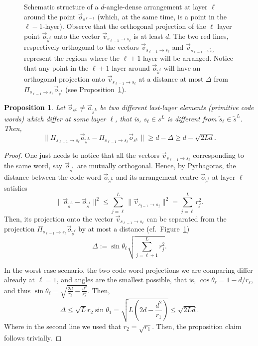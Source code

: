 \documentclass[10pt,a4paper]{amsart}
\newtheorem{proposition}{Proposition}
\begin{document}
\begin{figure}
    \centering
    
    \caption{Schematic structure of a $d$-angle-dense arrangement at layer $\ell$ around the point $\vec o_{s^{\ell-1}}$ (which, at the same time, is a point in the $\ell-1$-layer). Observe that the orthogonal projection of the $\ell$ layer point $\vec o_{\tilde s^\ell}$ onto the vector $\vec v_{s_{\ell-1}\to s_\ell}$ is at least $d$. The two red lines, respectively orthogonal to the vectors $\vec v_{s_{\ell-1}\to s_\ell}$ and $\vec v_{s_{\ell-1}\to \tilde s_\ell}$ represent the regions where the $\ell+1$ layer will be arranged. Notice that any point in the $\ell+1$ layer around $\vec o_{\tilde s^\ell}$ will have an orthogonal projection onto $\vec v_{s_{\ell-1}\to s_\ell}$ at a distance at most $\Delta$ from $\Pi_{s_{\ell-1}\to s_\ell}\vec o_{\tilde s^\ell}$ (see Proposition~\ref{proposition:concentration}).}
    \label{fig:subspaces}
\end{figure}

\begin{proposition}\label{proposition:concentration}
Let $\vec o_{s^L}\neq\vec o_{\tilde s^L}$ be two different last-layer elements (primitive code words) which differ at some layer $\ell$, that is, $s_\ell\in s^L$ is different from $\tilde s_\ell\in \tilde s^L$. Then,
\[
\|\Pi_{s_{\ell-1}\to s_\ell}\vec o_{\tilde s^L}-\Pi_{s_{\ell-1}\to s_\ell}\vec o_{s^L}\|\geq d-\Delta\geq d-\sqrt{2Ld}.
\]    
\end{proposition}

\begin{proof}
One just needs to notice that all the vectors $\vec v_{s_{\ell-1}\to s_\ell}$ corresponding to the same word, say $\vec o_{\tilde s^L}$ are mutually orthogonal. Hence, by Pythagoras, the distance between the code word $\vec o_{\tilde s^L}$ and its arrangement centre $\vec o_{\tilde s^\ell}$ at layer $\ell$ satisfies
\begin{equation}
\|\vec o_{\tilde s^L}-\vec o_{\tilde s^\ell}\|^2
\leq\sum_{j=\ell}^L \|\vec v_{s_{j-1}\to s_j}\|^2
=\sum_{j=\ell}^L r_j^2.
\end{equation}
Then, its projection onto the vector $\vec v_{s_{\ell-1}\to s_\ell}$ can be separated from the projection $\Pi_{s_{\ell-1}\to s_\ell}\vec o_{\tilde s^\ell}$ by at most a distance (cf.~Figure~\ref{fig:subspaces})
\begin{equation}\label{eq:delta_def}
    \Delta:=\sin\theta_\ell\sqrt{\sum_{j=\ell+1}^L r_j^2}.
\end{equation}

In the worst case scenario, the two code word projections we are comparing differ already at $\ell=1$, and angles are the smallest possible, that is, $\cos\theta_\ell=1-d/r_\ell$, and thus $\sin\theta_\ell=\sqrt{\frac{2d}{r_\ell}-\frac{d^2}{r_\ell^2}}$. Then,
\begin{equation}
  \Delta\leq\sqrt{L}r_2\sin\theta_1=\sqrt{L\left(2d-\frac{d^2}{r_1}\right)}\leq\sqrt{2Ld}.
\end{equation}
Where in the second line we used that $r_2=\sqrt{r_1}$. Then, the proposition claim follows trivially.
\end{proof}
\end{document}
